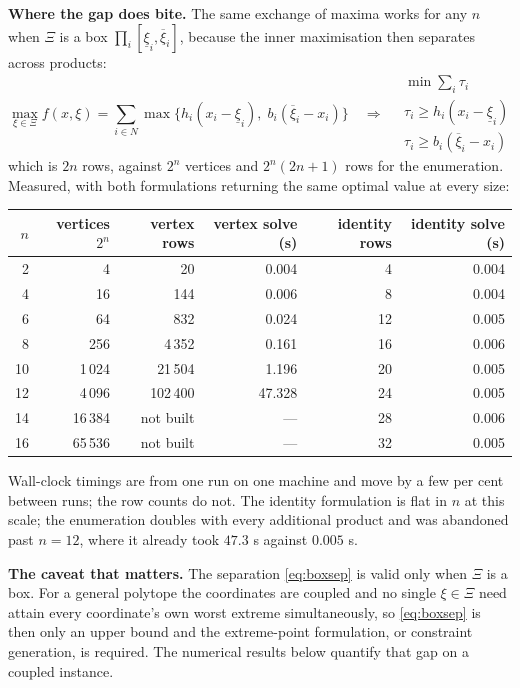 \documentclass[11pt]{article}
\theoremstyle{definition}
\begin{document}
\textbf{Where the gap does bite.} The same exchange of maxima works for
any $n$ when $\Xi$ is a box $\prod_i[\underline{\xi}_i,\overline{\xi}_i]$,
because the inner maximisation then separates across products:
\begin{equation}
  \max_{\xi \in \Xi} f(x,\xi)
  = \sum_{i\in N} \max\big\{ h_i(x_i-\underline{\xi}_i),\;
      b_i(\overline{\xi}_i-x_i) \big\}
  \quad\Longrightarrow\quad
  \begin{array}{l}
    \min \sum_i \tau_i \\
    \tau_i \ge h_i(x_i-\underline{\xi}_i) \\
    \tau_i \ge b_i(\overline{\xi}_i-x_i)
  \end{array}
  \label{eq:boxsep}
\end{equation}
which is $2n$ rows, against $2^{n}$ vertices and $2^{n}(2n+1)$ rows for
the enumeration. Measured, with both formulations returning the same
optimal value at every size:

\begin{center}
\begin{tabular}{@{}rrrrrr@{}}
\toprule
$n$ & vertices $2^n$ & vertex rows & vertex solve (s) &
  identity rows & identity solve (s) \\
\midrule
2  & 4     & 20      & 0.004  & 4  & 0.004 \\
4  & 16    & 144     & 0.006  & 8  & 0.004 \\
6  & 64    & 832     & 0.024  & 12 & 0.005 \\
8  & 256   & 4\,352  & 0.161  & 16 & 0.006 \\
10 & 1\,024 & 21\,504 & 1.196  & 20 & 0.005 \\
12 & 4\,096 & 102\,400 & 47.328 & 24 & 0.005 \\
14 & 16\,384 & not built & --- & 28 & 0.006 \\
16 & 65\,536 & not built & --- & 32 & 0.005 \\
\bottomrule
\end{tabular}
\end{center}

Wall-clock timings are from one run on one machine and move by a few
per cent between runs; the row counts do not. The identity formulation
is flat in $n$ at this scale; the enumeration
doubles with every additional product and was abandoned past $n=12$, where
it already took $47.3$ s against $0.005$ s.

\textbf{The caveat that matters.} The separation \eqref{eq:boxsep} is
valid only when $\Xi$ is a box. For a general polytope the coordinates are
coupled and no single $\xi \in \Xi$ need attain every coordinate's own
worst extreme simultaneously, so \eqref{eq:boxsep} is then only an upper
bound and the extreme-point formulation, or constraint generation, is
required. The numerical results below quantify that gap on a coupled
instance.
\end{document}
